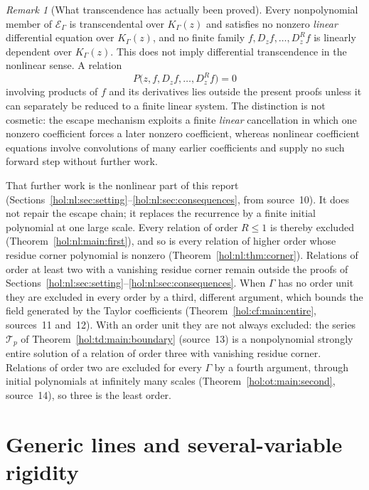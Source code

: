 \documentclass[11pt]{article}
\numberwithin{equation}{section}
\theoremstyle{definition}
\theoremstyle{remark}
\newtheorem{remark}[theorem]{Remark}
\newcommand{\K}{K_\Gamma}
\newcommand{\E}{\mathcal E_\Gamma}
\begin{document}
\begin{remark}[What transcendence has actually been proved]
\label{hol:rem:transcendence}
Every nonpolynomial member of $\E$ is transcendental over $\K(z)$ and
satisfies no nonzero \emph{linear} differential equation over $\K(z)$, and no
finite family $f,D_zf,\ldots,D_z^Rf$ is linearly dependent over $\K(z)$. This
does not imply differential transcendence in the nonlinear sense. A relation
\[
 P\bigl(z,f,D_zf,\ldots,D_z^Rf\bigr)=0
\]
involving products of $f$ and its derivatives lies outside the present proofs
unless it can separately be reduced to a finite linear system. The
distinction is not cosmetic: the escape mechanism exploits a finite
\emph{linear} cancellation in which one nonzero coefficient forces a later
nonzero coefficient, whereas nonlinear coefficient equations involve
convolutions of many earlier coefficients and supply no such forward step
without further work.

That further work is the nonlinear part of this report
(Sections~\ref{hol:nl:sec:setting}--\ref{hol:nl:sec:consequences}, from
source~10). It does not repair the escape chain; it replaces the recurrence by
a finite initial polynomial at one large scale. Every relation of order
$R\le1$ is thereby excluded (Theorem~\ref{hol:nl:main:first}), and so is every
relation of higher order whose residue corner polynomial is nonzero
(Theorem~\ref{hol:nl:thm:corner}). Relations of order at least two with a
vanishing residue corner remain outside the proofs of
Sections~\ref{hol:nl:sec:setting}--\ref{hol:nl:sec:consequences}. When
$\Gamma$ has no order unit they are excluded in every order by a third,
different argument, which bounds the field generated by the Taylor
coefficients (Theorem~\ref{hol:cf:main:entire}, sources~11 and~12). With an
order unit they are not always excluded: the series $\mathcal T_p$ of
Theorem~\ref{hol:td:main:boundary} (source~13) is a nonpolynomial strongly
entire solution of a relation of order three with vanishing residue corner.
Relations of order two are excluded for every $\Gamma$ by a fourth argument,
through initial polynomials at infinitely many scales
(Theorem~\ref{hol:ot:main:second}, source~14), so three is the least order.
\end{remark}

\section{Generic lines and several-variable rigidity}\label{hol:sec:multi}
\end{document}
